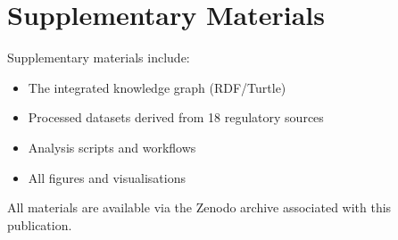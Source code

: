 \section*{Supplementary Materials}
\label{sec:supplementary_materials}
Supplementary materials include:

\begin{itemize}
    \item The integrated knowledge graph (RDF/Turtle)
    \item Processed datasets derived from 18 regulatory sources
    \item Analysis scripts and workflows
    \item All figures and visualisations
\end{itemize}

All materials are available via the Zenodo archive associated with this publication.